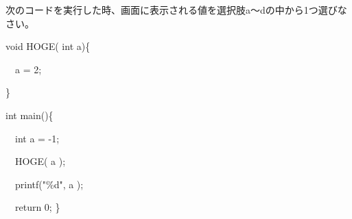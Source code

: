 次のコードを実行した時、画面に表示される値を選択肢a〜dの中から1つ選びなさい。\par
\noindent void HOGE( int a)\{ \par
\noindent 　a = 2; \par
\noindent \} \par
\noindent int main()\{ \par
\noindent 　int a = -1; \par
\noindent 　HOGE( a ); \par
\noindent 　printf("\%d", a ); \par
\noindent 　return 0; \} \par
